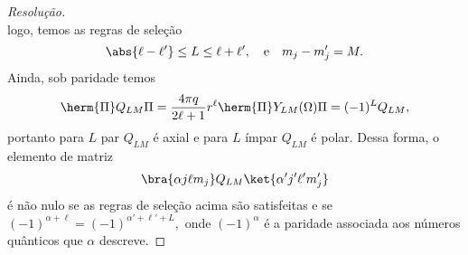 \begin{proof}[Resolução]
\begin{equation*}
   \end{equation*}
   logo, temos as regras de seleção
   \begin{equation*}
      \abs{\ell - \ell'} \leq L \leq \ell + \ell',\quad\text{e}\quad m_j - m_j' = M.
   \end{equation*}
   Ainda, sob paridade temos 
   \begin{equation*}
      \herm{\Pi} Q_{LM} \Pi = \frac{4\pi q}{2\ell + 1} r^\ell \herm{\Pi} Y_{LM}(\Omega) \Pi = (-1)^L Q_{LM},
   \end{equation*}
   portanto para \(L\) par \(Q_{LM}\) é axial e para \(L\) ímpar \(Q_{LM}\) é polar. Dessa forma, o elemento de matriz
   \begin{equation*}
      \bra{\alpha j \ell m_j}Q_{LM}\ket{\alpha' j' \ell' m_j'}
   \end{equation*}
   é não nulo se as regras de seleção acima são satisfeitas e se \((-1)^{\alpha + \ell} = (-1)^{\alpha' + \ell' + L},\) onde \((-1)^{\alpha}\) é a paridade associada aos números quânticos que \(\alpha\) descreve.
\end{proof}
